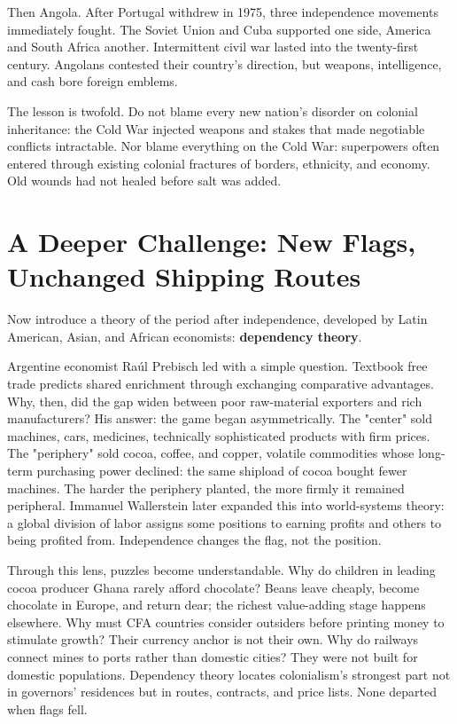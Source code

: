 Then Angola. After Portugal withdrew in 1975, three independence movements immediately fought. The Soviet Union and Cuba supported one side, America and South Africa another. Intermittent civil war lasted into the twenty-first century. Angolans contested their country's direction, but weapons, intelligence, and cash bore foreign emblems.

The lesson is twofold. Do not blame every new nation's disorder on colonial inheritance: the Cold War injected weapons and stakes that made negotiable conflicts intractable. Nor blame everything on the Cold War: superpowers often entered through existing colonial fractures of borders, ethnicity, and economy. Old wounds had not healed before salt was added.

\section[New Flags, Unchanged Shipping Routes]{A Deeper Challenge: New Flags, Unchanged Shipping Routes}
Now introduce a theory of the period after independence, developed by Latin American, Asian, and African economists: \textbf{dependency theory}.

Argentine economist Raúl Prebisch led with a simple question. Textbook free trade predicts shared enrichment through exchanging comparative advantages. Why, then, did the gap widen between poor raw-material exporters and rich manufacturers? His answer: the game began asymmetrically. The "center" sold machines, cars, medicines, technically sophisticated products with firm prices. The "periphery" sold cocoa, coffee, and copper, volatile commodities whose long-term purchasing power declined: the same shipload of cocoa bought fewer machines. The harder the periphery planted, the more firmly it remained peripheral. Immanuel Wallerstein later expanded this into world-systems theory: a global division of labor assigns some positions to earning profits and others to being profited from. Independence changes the flag, not the position.

Through this lens, puzzles become understandable. Why do children in leading cocoa producer Ghana rarely afford chocolate? Beans leave cheaply, become chocolate in Europe, and return dear; the richest value-adding stage happens elsewhere. Why must CFA countries consider outsiders before printing money to stimulate growth? Their currency anchor is not their own. Why do railways connect mines to ports rather than domestic cities? They were not built for domestic populations. Dependency theory locates colonialism's strongest part not in governors' residences but in routes, contracts, and price lists. None departed when flags fell.

